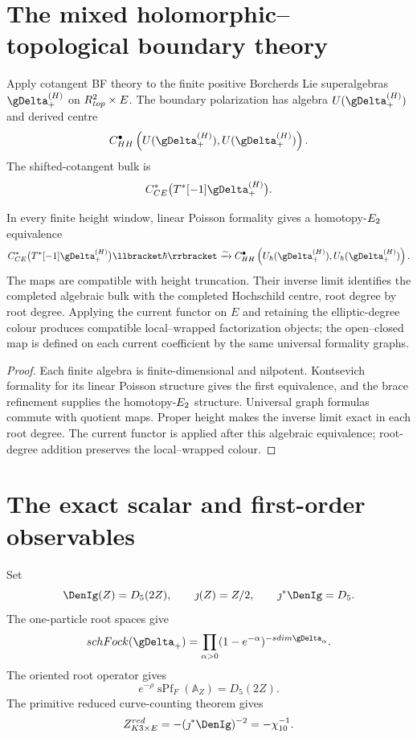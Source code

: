 \chapter{The mixed holomorphic--topological boundary theory}
Apply cotangent BF theory to the finite positive Borcherds Lie superalgebras $\gDelta_+^{(H)}$ on $R^2_{top}\times E$.  The boundary polarization has algebra $U(\gDelta_+^{(H)})$ and derived centre
\[
 C^\bullet_{\HH}
 \left(U(\gDelta_+^{(H)}),U(\gDelta_+^{(H)})\right).
\]
The shifted-cotangent bulk is
\[
 C^*_{\CE}\bigl(T^*[-1]\gDelta_+^{(H)}\bigr).
\]

\begin{theorem}
In every finite height window, linear Poisson formality gives a homotopy-$E_2$ equivalence
\[
 C^*_{\CE}\bigl(T^*[-1]\gDelta_+^{(H)}\bigr)\llbracket\hbarq\rrbracket
 \xrightarrow{\sim}
 C^\bullet_{\HH}
 \left(U_\hbar(\gDelta_+^{(H)}),U_\hbar(\gDelta_+^{(H)})\right).
\]
The maps are compatible with height truncation.  Their inverse limit identifies the completed algebraic bulk with the completed Hochschild centre, root degree by root degree.  Applying the current functor on $E$ and retaining the elliptic-degree colour produces compatible local--wrapped factorization objects; the open--closed map is defined on each current coefficient by the same universal formality graphs.
\end{theorem}
\begin{proof}
Each finite algebra is finite-dimensional and nilpotent.  Kontsevich formality for its linear Poisson structure gives the first equivalence, and the brace refinement supplies the homotopy-$E_2$ structure.  Universal graph formulas commute with quotient maps.  Proper height makes the inverse limit exact in each root degree.  The current functor is applied after this algebraic equivalence; root-degree addition preserves the local--wrapped colour.
\end{proof}

\chapter{The exact scalar and first-order observables}
Set
\[
 \DenIg(Z)=D_5(2Z),
 \qquad \jmath(Z)=Z/2,
 \qquad \jmath^*\DenIg=D_5.
\]
The one-particle root spaces give
\[
 \sch\Fock(\gDelta_+)
 =\prod_{\alpha>0}(1-e^{-\alpha})^{-\sdim\gDelta_\alpha}.
\]
The oriented root operator gives
\[
 e^{-\rho}\operatorname{sPf}_F(\mathbb A_Z)=D_5(2Z).
\]
The primitive reduced curve-counting theorem gives
\[
 \mathcal Z^{\red}_{K3\times E}=-(\jmath^*\DenIg)^{-2}=-\chi_{10}^{-1}.
\]

